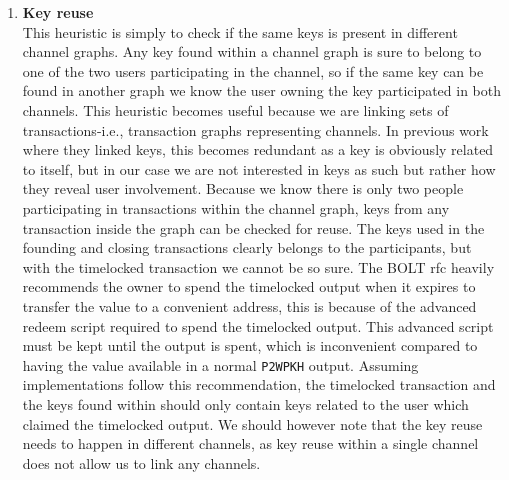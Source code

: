 \begin{enumerate}

    \item \textbf{Key reuse}\\
This heuristic is simply to check if the same keys is present in different channel graphs.  
Any key found within a channel graph is sure to belong to one of the two users participating in the channel, so if the same key can be found in another graph we know the user owning the key participated in both channels.
This heuristic becomes useful because we are linking sets of transactions-i.e., transaction graphs representing channels. In previous work where they linked keys, this becomes redundant as a key is obviously related to itself, but in our case we are not interested in keys as such but rather how they reveal user involvement. Because we know there is only two people participating in transactions within the channel graph, keys from any transaction inside the graph can be checked for reuse. The keys used in the founding and closing transactions clearly belongs to the participants, but with the timelocked transaction we cannot be so sure. The BOLT rfc \cite{bolt5} heavily recommends the owner to spend the timelocked output when it expires to transfer the value to a convenient address, this is because of the advanced redeem script required to spend the timelocked output. This advanced script must be kept until the output is spent, which is inconvenient compared to having the value available in a normal {\tt P2WPKH} output.
Assuming implementations follow this recommendation, the timelocked transaction and the keys found within should only contain keys related to the user which claimed the timelocked output. We should however note that the key reuse needs to happen in different channels, as key reuse within a single channel does not allow us to link any channels.
\\


\end{enumerate}
